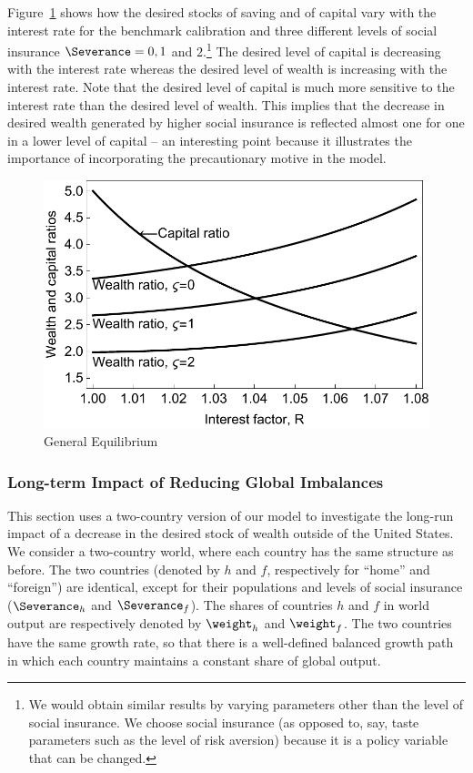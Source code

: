 \documentclass[titlepage]{\econtex}\newcommand{\texname}{cjSOE}
\begin{document}
Figure~\ref{fig:genEqbm} shows how the desired stocks of saving and of capital vary
with the interest rate for the benchmark calibration and three
different levels of social insurance $\Severance=0, 1$ and
$2$.\footnote{We would obtain similar results by varying parameters
  other than the level of social insurance. We choose social insurance
  (as opposed to, say, taste parameters such as the level of risk
  aversion) because it is a policy variable that can be changed.} The
desired level of capital is decreasing with the interest rate whereas
the desired level of wealth is increasing with the interest rate. Note
that the desired level of capital is much more sensitive to the
interest rate than the desired level of wealth. This implies that the
decrease in desired wealth generated by higher social insurance is
reflected almost one for one in a lower level of capital -- an interesting
point because it illustrates the importance of incorporating the precautionary
motive in the model.

\medskip

\begin{figure}
\includegraphics{./Figures/genEqbm}
\caption{General Equilibrium}\label{fig:genEqbm}
\end{figure}

\medskip

\subsubsection{Long-term Impact of Reducing Global Imbalances}

This section uses a two-country version of our model to investigate the long-run impact of a decrease in the desired stock of wealth outside of the United States. We consider a two-country world, where each country has the same structure as before. The two countries (denoted by $h$ and $f$, respectively for ``home'' and ``foreign'') are identical, except for their populations and levels of social insurance ($\Severance_h$ and $\Severance_f$). The shares of countries $h$ and $f$ in world output are respectively denoted by $\weight_h$ and $\weight_f$. The two countries have the same growth rate, so that there is a well-defined balanced growth path in which each country maintains a constant share of global output.
\end{document}
